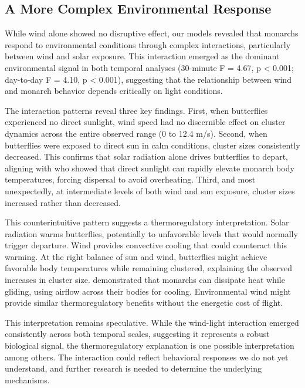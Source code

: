 \subsection{A More Complex Environmental Response}

While wind alone showed no disruptive effect, our models revealed that monarchs respond to environmental conditions through complex interactions, particularly between wind and solar exposure. This interaction emerged as the dominant environmental signal in both temporal analyses (30-minute F = 4.67, p < 0.001; day-to-day F = 4.10, p < 0.001), suggesting that the relationship between wind and monarch behavior depends critically on light conditions.

The interaction patterns reveal three key findings. First, when butterflies experienced no direct sunlight, wind speed had no discernible effect on cluster dynamics across the entire observed range (0 to 12.4 m/s). Second, when butterflies were exposed to direct sun in calm conditions, cluster sizes consistently decreased. This confirms that solar radiation alone drives butterflies to depart, aligning with \textcite{mastersMonarchButterflyDanaus1988} who showed that direct sunlight can rapidly elevate monarch body temperatures, forcing dispersal to avoid overheating. Third, and most unexpectedly, at intermediate levels of both wind and sun exposure, cluster sizes increased rather than decreased.

This counterintuitive pattern suggests a thermoregulatory interpretation. Solar radiation warms butterflies, potentially to unfavorable levels that would normally trigger departure. Wind provides convective cooling that could counteract this warming. At the right balance of sun and wind, butterflies might achieve favorable body temperatures while remaining clustered, explaining the observed increases in cluster size. \textcite{mastersMonarchButterflyDanaus1988} demonstrated that monarchs can dissipate heat while gliding, using airflow across their bodies for cooling. Environmental wind might provide similar thermoregulatory benefits without the energetic cost of flight.

This interpretation remains speculative. While the wind-light interaction emerged consistently across both temporal scales, suggesting it represents a robust biological signal, the thermoregulatory explanation is one possible interpretation among others. The interaction could reflect behavioral responses we do not yet understand, and further research is needed to determine the underlying mechanisms.

